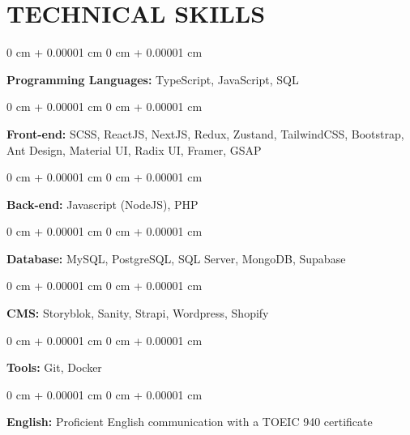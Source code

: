 \documentclass[10pt, letterpaper]{article}
\newenvironment{onecolentry}{
    \begin{adjustwidth}{
        0 cm + 0.00001 cm
    }{
        0 cm + 0.00001 cm
    }
}{
    \end{adjustwidth}
} %
\begin{document}
    \section{TECHNICAL SKILLS}
        \begin{onecolentry}
            \textbf{Programming Languages:} TypeScript, JavaScript, SQL
        \end{onecolentry}
        \vspace{0.2 cm}
        \begin{onecolentry}
            \textbf{Front-end:} SCSS, ReactJS, NextJS, Redux, Zustand, TailwindCSS, Bootstrap, Ant Design, Material UI, Radix UI, Framer, GSAP
        \end{onecolentry}
        \vspace{0.2 cm}
        \begin{onecolentry}
            \textbf{Back-end:} Javascript (NodeJS), PHP   
        \end{onecolentry}
        \vspace{0.2 cm}
        \begin{onecolentry}
            \textbf{Database:} MySQL, PostgreSQL, SQL Server, MongoDB, Supabase
        \end{onecolentry}
        \vspace{0.2 cm}
        \begin{onecolentry}
            \textbf{CMS:} Storyblok, Sanity, Strapi, Wordpress, Shopify
        \end{onecolentry}
        \vspace{0.2 cm}
        \begin{onecolentry}
            \textbf{Tools:} Git, Docker \end{onecolentry}
        \vspace{0.2 cm}
        \begin{onecolentry}
            \textbf{English:} Proficient English communication with a TOEIC 940 certificate
        \end{onecolentry}
\end{document}

